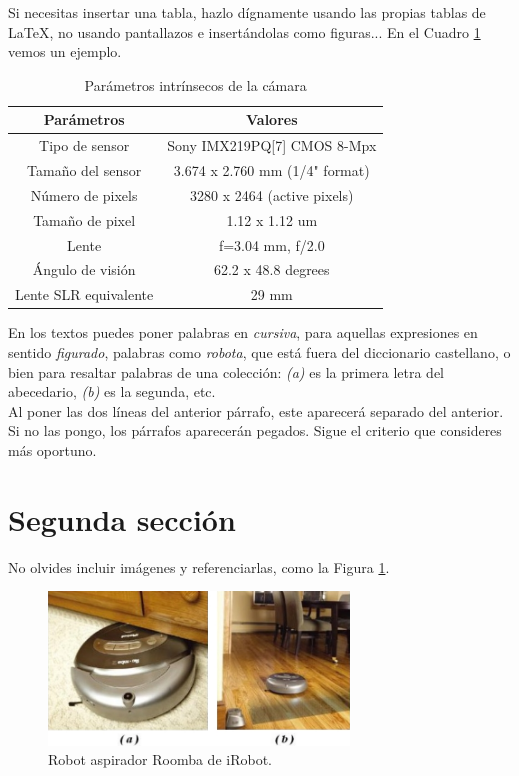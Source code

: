 			Si necesitas insertar una tabla, hazlo dígnamente usando las propias tablas de \LaTeX, no usando pantallazos e insertándolas como figuras... En el Cuadro \ref{cuadro:ejemplo} vemos un ejemplo.
			
			\begin{table}[H]
				\begin{center}
					\begin{tabular}{|c|c|}
						\hline
						\textbf{Parámetros} & \textbf{Valores} \\
						\hline
						Tipo de sensor & Sony IMX219PQ[7] CMOS 8-Mpx \\
						Tamaño del sensor & 3.674 x 2.760 mm (1/4" format) \\
						Número de pixels & 3280 x 2464 (active pixels) \\
						Tamaño de pixel & 1.12 x 1.12 um \\
						Lente & f=3.04 mm, f/2.0 \\
						Ángulo de visión & 62.2 x 48.8 degrees \\
						Lente SLR equivalente & 29 mm \\
						\hline
					\end{tabular}
					\caption{Parámetros intrínsecos de la cámara}
					\label{cuadro:ejemplo}
				\end{center}
			\end{table}
			
			En los textos puedes poner palabras en \textit{cursiva}, para aquellas expresiones en sentido \textit{figurado}, palabras como \textit{robota}, que está fuera del diccionario castellano, o bien para resaltar palabras de una colección: \textit{(a)} es la primera letra del abecedario, \textit{(b)} es la segunda, etc.\\
			
			Al poner las dos líneas del anterior párrafo, este aparecerá separado del anterior. Si no las pongo, los párrafos aparecerán pegados. Sigue el criterio que consideres más oportuno.
			
			\section{Segunda sección}
			\label{sec:segundaseccion}
			
			No olvides incluir imágenes y referenciarlas, como la Figura \ref{fig:roomba}.
			
			\begin{figure} [h!]
				\begin{center}
					\includegraphics[width=8cm]{figs/roomba}
				\end{center}
				\caption{Robot aspirador Roomba de iRobot.}
				\label{fig:roomba}
			\end{figure}\
			
